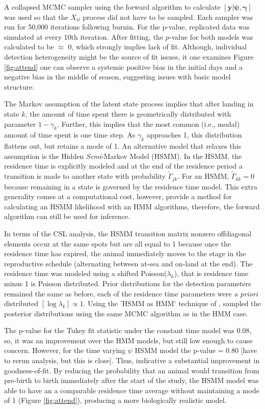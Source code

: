 \documentclass[12pt,english]{article}
\begin{document}
\begin{spacing}{1.9}
 A collapsed MCMC sampler using the forward algorithm to calculate $[\mathbf{y}|\boldsymbol{\psi},\boldsymbol{\gamma}]$ was used so that the $X_{it}$ process did not have to be sampled. Each sampler was run for 50,000 iterations following burnin. For the p-value, replicated data was simulated at every 10th iteration. After fitting, the $p$-value for both models was calculated to be $\approx$ 0, which strongly implies lack of fit.  Although, individual detection heterogeneity might be the source of fit issues, it one examines Figure \ref{fig:attend} one can observe a systemic positive bias in the initial days and a negative bias in the middle of season, suggesting issues with basic model structure.     
 
 The Markov assumption of the latent state process implies that after landing in state $k$, the amount of time spent there is geometrically distributed with parameter $1-\gamma_k$. Further, this implies that the most common (i.e., modal) amount of time spent is one time step. As $\gamma_k$ approaches 1, this distribution flattens out, but retains a mode of 1. An alternative model that relaxes this assumption is the Hidden {\it Semi}-Markov Model (HSMM). In the HSMM, the residence time is explicitly modeled and at the end of the residence period a transition is made to another state with probability $\tilde\Gamma_{jk}$. For an HSMM, $\tilde\Gamma_{kk} = 0$ because remaining in a state is governed by the residence time model. This extra generality comes at a computational cost, however, \citet{langrock2011hidden} provide a method for calculating an HSMM likelihood with an HMM algorithms, therefore, the forward algorithm can still be used for inference. 
 
    In terms of the CSL analysis, the HSMM transition matrix nonzero offdiagonal elements occur at the same spots but are all equal to 1 because once the residence time has expired, the animal immediately moves to the stage in the reproductive schedule (alternating between at-sea and on-land at the end). The residence time was modeled using a shifted Poisson($\lambda_k$), that is residence time minus 1 is Poisson distributed. Prior distributions for the detection parameters remained the same as before, each of the residence time parameters were {\it a priori} distributed $[\log \lambda_k] \propto 1$. Using the 'HSMM as HMM' technique of \citet{langrock2011hidden}, sampled the posterior distributions using the same MCMC algorithm as in the HMM case. 
    
    The p-value for the Tukey fit statistic under the constant time model was $0.08$, so, it was an improvement over the HMM models, but still low enough to cause concern. However, for the time varying $\psi$ HSMM model the p-value = 0.80 [{\sc have to rerun analysis, but this is close}]. Thus, indicative a substantial improvement in goodness-of-fit. By reducing the probability that an animal would transition from pre-birth to birth immediately after the start of the study, the HSMM model was able to have an a comparable residence time average without maintaining a mode of 1 (Figure \ref{fig:attend}), producing a more biologically realistic model.    
     

\end{spacing}
\end{document}
